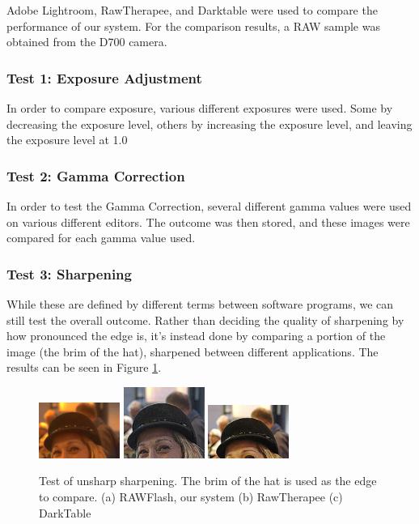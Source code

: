 \documentclass[10pt,a4paper]{article}
\begin{document}
Adobe Lightroom, RawTherapee, and Darktable were used to compare the performance of our system. For the comparison results,
a RAW sample was obtained from the D700 camera.

\subsubsection{Test 1: Exposure Adjustment}
In order to compare exposure, various different exposures were used. Some by decreasing the exposure level, others by
increasing the exposure level, and leaving the exposure level at 1.0

\subsubsection{Test 2: Gamma Correction}
In order to test the Gamma Correction, several different gamma values were used on various different editors.
The outcome was then stored, and these images were compared for each gamma value used.


\subsubsection{Test 3: Sharpening}
While these are defined by different terms between software programs, we can still test the overall outcome.
Rather than deciding the quality of sharpening by how pronounced the edge is, it's instead done by comparing a portion
of the image (the brim of the hat), sharpened between different applications. The results can be seen in Figure \ref{unsharpcomparison}.

\begin{figure}\label{unsharpcomparison}
    \centering
    \subfigure
    {
        \includegraphics[width=100px]{rawflash_hat_sharp}
    }
    \subfigure
    {
        \includegraphics[width=100px]{rawtherapee_unsharp_max}
    }
    \subfigure
    {
        \includegraphics[width=100px]{darktable_unsharp}
    }
    \caption{
        Test of unsharp sharpening. The brim of the hat is used as the edge to compare. 
        (a) RAWFlash, our system
        (b) RawTherapee
        (c) DarkTable
    }
 \end{figure}
\end{document}
